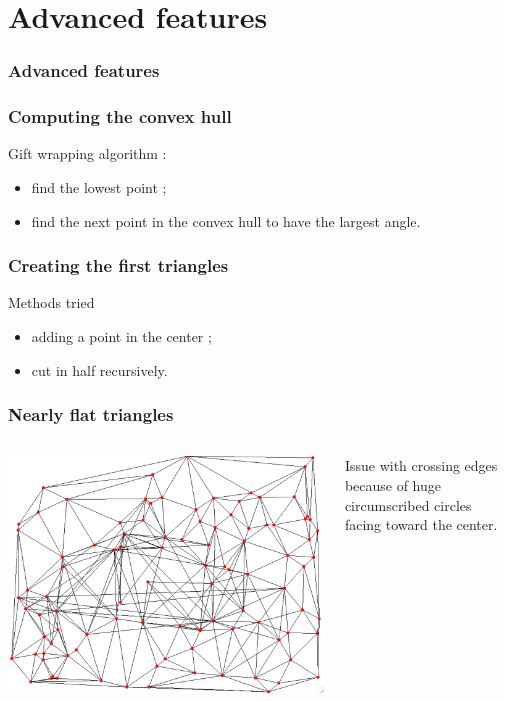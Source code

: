 \documentclass{beamer}
\begin{document}
	
	\section{Advanced features}
	\begin{frame}
		\frametitle{Advanced features}
		\tableofcontents[currentsection]
	\end{frame}
	
	\begin{frame}
		\frametitle{Computing the convex hull}
		Gift wrapping algorithm :
		\begin{itemize}
			\item find the lowest point ;
			\item find the next point in the convex hull to have the largest angle.
		\end{itemize}
	\end{frame}
	
	\begin{frame}
		\frametitle{Creating the first triangles}
		\begin{block}{Methods tried}
			\begin{itemize}
				\item adding a point in the center ;
				\item cut in half recursively.
			\end{itemize}
		\end{block}
	\end{frame}
	
	\begin{frame}
		\frametitle{Nearly flat triangles}
		\begin{columns}[T]
			\begin{column}{.5\textwidth}
				\hspace*{0cm} \includegraphics[height=0.5\textheight]{convexhull-messedup-abit.png} \hspace*{\fill}
			\end{column}
			\begin{column}{.45\textwidth}
				Issue with crossing edges because of huge circumscribed circles facing toward the center.
			\end{column}
		\end{columns}
	\end{frame}
\end{document}
